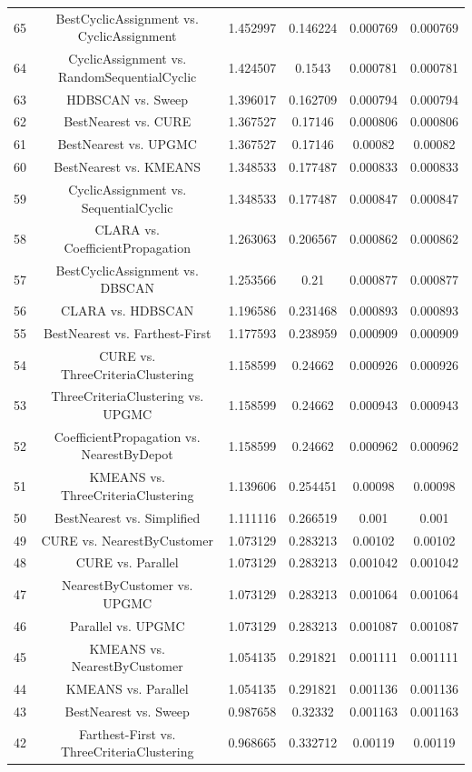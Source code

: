 \documentclass[a4paper,10pt]{article}
\begin{document}
\begin{landscape}
\begin{table}[!htp]
\begin{tabular}{cccccc}
65&BestCyclicAssignment vs. CyclicAssignment&1.452997&0.146224&0.000769&0.000769\\
64&CyclicAssignment vs. RandomSequentialCyclic&1.424507&0.1543&0.000781&0.000781\\
63&HDBSCAN vs. Sweep&1.396017&0.162709&0.000794&0.000794\\
62&BestNearest vs. CURE&1.367527&0.17146&0.000806&0.000806\\
61&BestNearest vs. UPGMC&1.367527&0.17146&0.00082&0.00082\\
60&BestNearest vs. KMEANS&1.348533&0.177487&0.000833&0.000833\\
59&CyclicAssignment vs. SequentialCyclic&1.348533&0.177487&0.000847&0.000847\\
58&CLARA vs. CoefficientPropagation&1.263063&0.206567&0.000862&0.000862\\
57&BestCyclicAssignment vs. DBSCAN&1.253566&0.21&0.000877&0.000877\\
56&CLARA vs. HDBSCAN&1.196586&0.231468&0.000893&0.000893\\
55&BestNearest vs. Farthest-First&1.177593&0.238959&0.000909&0.000909\\
54&CURE vs. ThreeCriteriaClustering&1.158599&0.24662&0.000926&0.000926\\
53&ThreeCriteriaClustering vs. UPGMC&1.158599&0.24662&0.000943&0.000943\\
52&CoefficientPropagation vs. NearestByDepot&1.158599&0.24662&0.000962&0.000962\\
51&KMEANS vs. ThreeCriteriaClustering&1.139606&0.254451&0.00098&0.00098\\
50&BestNearest vs. Simplified&1.111116&0.266519&0.001&0.001\\
49&CURE vs. NearestByCustomer&1.073129&0.283213&0.00102&0.00102\\
48&CURE vs. Parallel&1.073129&0.283213&0.001042&0.001042\\
47&NearestByCustomer vs. UPGMC&1.073129&0.283213&0.001064&0.001064\\
46&Parallel vs. UPGMC&1.073129&0.283213&0.001087&0.001087\\
45&KMEANS vs. NearestByCustomer&1.054135&0.291821&0.001111&0.001111\\
44&KMEANS vs. Parallel&1.054135&0.291821&0.001136&0.001136\\
43&BestNearest vs. Sweep&0.987658&0.32332&0.001163&0.001163\\
42&Farthest-First vs. ThreeCriteriaClustering&0.968665&0.332712&0.00119&0.00119\\

\end{tabular}
\end{table}
\end{landscape}
\end{document}
